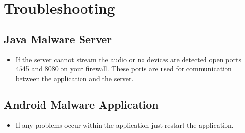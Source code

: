 \documentclass[a4paper,12pt,titlepage]{article}
\begin{document}
\section{Troubleshooting}
\subsection{Java Malware Server}
\begin{itemize}
\item If the server cannot stream the audio or no devices are detected open ports 4545 and 8080 on your firewall. These ports are used for communication between the application and the server.
\end{itemize}
\subsection{Android Malware Application}
\begin{itemize}
\item If any problems occur within the application just restart the application.
\end{itemize}
\end{document}
